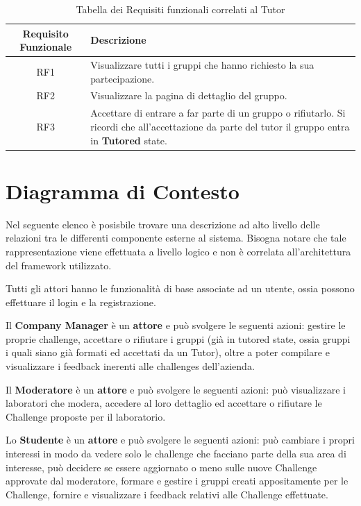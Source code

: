 \begin{table}[ht]
    \centering
    \begin{tabularx}{\textwidth}{|c|X|}
        \hline
        \textbf{Requisito Funzionale} & \textbf{Descrizione}\\
        \hline
        RF1 & Visualizzare tutti i gruppi che hanno richiesto la sua partecipazione.\\ 
        \hline
        RF2 & Visualizzare la pagina di dettaglio del gruppo.\\ 
        \hline
        RF3 & Accettare di entrare a far parte di un gruppo o rifiutarlo. Si ricordi che all'accettazione da parte del tutor il gruppo entra in \textbf{Tutored }state.\\ 
        \hline
    \end{tabularx}
    \caption{Tabella dei Requisiti funzionali correlati al Tutor}
\end{table}

\section{Diagramma di Contesto}

Nel seguente elenco è posisbile trovare una descrizione ad alto livello delle relazioni tra le differenti componente esterne al sistema. Bisogna notare che tale rappresentazione viene effettuata a livello logico e non è correlata all'architettura del framework utilizzato.

Tutti gli attori hanno le funzionalità di base associate ad un utente, ossia possono effettuare il login e la registrazione. 

Il \textbf{Company Manager} è un \textbf{attore} e può svolgere le seguenti azioni: gestire le proprie challenge, accettare o rifiutare i gruppi (già in tutored state, ossia gruppi i quali siano già formati ed accettati da un Tutor), oltre a poter compilare e visualizzare i feedback inerenti alle challenges dell'azienda.

Il \textbf{Moderatore} è un \textbf{attore} e può svolgere le seguenti azioni: può visualizzare i laboratori che modera, accedere al loro dettaglio ed accettare o rifiutare le Challenge proposte per il laboratorio.

Lo \textbf{Studente} è un \textbf{attore} e può svolgere le seguenti azioni: può cambiare i propri interessi in modo da vedere solo le challenge che facciano parte della sua area di interesse, può decidere se essere aggiornato o meno sulle nuove Challenge approvate dal moderatore, formare e gestire i gruppi creati appositamente per le Challenge, fornire e visualizzare i feedback relativi alle Challenge effettuate.

